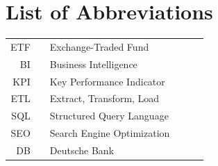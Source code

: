 \documentclass[11pt,a4paper]{article}
\begin{document}
\onehalfspacing
\setcounter{tocdepth}{4}
\parindent=0in
\parskip=8pt  %
\setlength{\belowcaptionskip}{-10pt}

\newpage
\tableofcontents

\newpage

\pagebreak
\listoffigures
\listoftables

\newpage
\section*{List of Abbreviations}

\begin{tabular}{rp{0.2cm}lp{1cm}p{7cm}l}
    ETF     & &  \small Exchange-Traded Fund   & &      \\
    BI     & &  \small Business Intelligence   & & \\
    KPI     & &  \small Key Performance Indicator   & & \\
    ETL     & &  \small Extract, Transform, Load   & & \\
    SQL     & &  \small Structured Query Language  & & \\
    SEO     & &  \small Search Engine Optimization  & & \\
        DB     & &  \small Deutsche Bank  & & \\
\end{tabular}

\captionsetup{justification=justified,singlelinecheck=false}

\pagebreak
{}
\flushbottom
\doublespacing
\parindent=1cm

\end{document}
